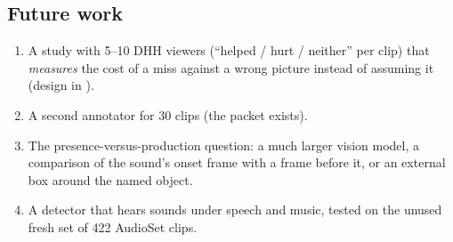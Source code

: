 \subsection{Future work}
\begin{enumerate}
  \item A study with 5--10 DHH viewers (``helped / hurt / neither'' per clip) that \emph{measures} the cost of a miss
        against a wrong picture instead of assuming it (design in ).
  \item A second annotator for 30 clips (the packet exists).
  \item The presence-versus-production question: a much larger vision model, a comparison of the sound's onset frame
        with a frame before it, or an external box around the named object.
  \item A detector that hears sounds under speech and music, tested on the unused fresh set of 422 AudioSet clips.
\end{enumerate}

